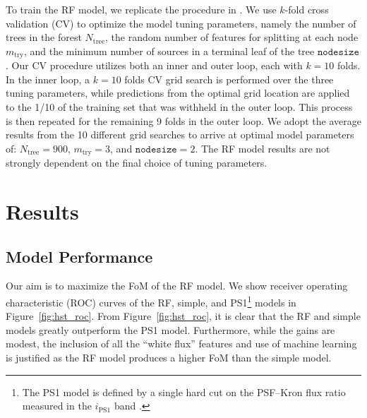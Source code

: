 \documentclass[twocolumn]{aastex63}
\begin{document}
To train the RF model, we replicate the procedure in \citet{Tachibana18}. We
use $k$-fold cross validation (CV) to optimize the model tuning parameters,
namely the number of trees in the forest $N_\mathrm{tree}$, the random number
of features for splitting at each node $m_\mathrm{try}$, and the minimum
number of sources in a terminal leaf of the tree $\mathtt{nodesize}$. Our CV
procedure utilizes both an inner and outer loop, each with $k = 10$ folds. In
the inner loop, a $k = 10$ folds CV grid search is performed over the three
tuning parameters, while predictions from the optimal grid location are
applied to the 1/10 of the training set that was withheld in the outer loop.
This process is then repeated for the remaining 9 folds in the outer loop. We
adopt the average results from the 10 different grid searches to arrive at
optimal model parameters of: $N_\mathrm{tree} = 900$, $m_\mathrm{try}
= 3$, and $\mathtt{nodesize} = 2$. The RF model results are not strongly
dependent on the final choice of tuning parameters.

\section{Results}\label{sec:results}

\subsection{Model Performance}

Our aim is to maximize the FoM of the RF model. We show receiver operating
characteristic (ROC) curves of the RF, simple, and PS1\footnote{The PS1 model
is defined by a single hard cut on the PSF--Kron flux ratio measured in the
$i_\mathrm{PS1}$ band \citep[for further details see][]{Tachibana18}.} models
in Figure~\ref{fig:hst_roc}. From Figure~\ref{fig:hst_roc}, it is clear that
the RF and simple models greatly outperform the PS1 model. Furthermore, while
the gains are modest, the inclusion of all the ``white flux'' features and use
of machine learning is justified as the RF model produces a higher FoM than
the simple model.
\end{document}
